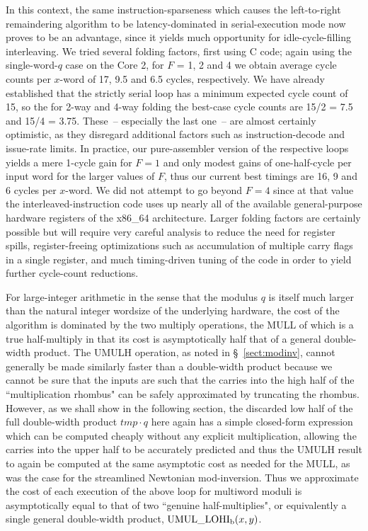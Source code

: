 \documentclass{article}
\begin{document}
In this context, the same instruction-sparseness which causes the left-to-right remaindering algorithm to be latency-dominated in serial-execution mode now proves to be an advantage, since it yields much opportunity for idle-cycle-filling interleaving.  We tried several folding factors, first using C code; again using the single-word-$q$ case on the Core 2, for $F$ = 1, 2 and 4 we obtain average cycle counts per $x$-word of 17, 9.5 and 6.5 cycles, respectively. We have already established that the strictly serial loop has a minimum expected cycle count of 15, so the for 2-way and 4-way folding the best-case cycle counts are 15/2 = 7.5 and 15/4 = 3.75. These~-- especially the last one~-- are almost certainly optimistic, as they disregard additional factors such as instruction-decode and issue-rate limits. In practice, our pure-assembler version of the respective loops yields a mere 1-cycle gain for $F=1$ and only modest gains of one-half-cycle per input word for the larger values of $F$, thus our current best timings are 16, 9 and 6 cycles per $x$-word. We did not attempt to go beyond $F = 4$ since at that value the interleaved-instruction code uses up nearly all of the available general-purpose hardware registers of the x86\_64 architecture. Larger folding factors are certainly possible but will require very careful analysis to reduce the need for register spills, register-freeing optimizations such as accumulation of multiple carry flags in a single register, and much timing-driven tuning of the code in order to yield further cycle-count reductions.

For large-integer arithmetic in the sense that the modulus $q$ is itself much larger than the natural integer wordsize of the underlying hardware, the cost of the algorithm is dominated by the two multiply operations, the MULL of which is a true half-multiply in that its cost is asymptotically half that of a general double-width product. The UMULH operation, as noted in \S~\ref{sect:modinv}, cannot generally be made similarly faster than a double-width product because we cannot be sure that the inputs are such that the carries into the high half of the ``multiplication rhombus" can be safely approximated by truncating the rhombus. However, as we shall show in the following section, the discarded low half of the full double-width product $tmp \cdot q$ here again has a simple closed-form expression which can be computed cheaply without any explicit multiplication, allowing the carries into the upper half to be accurately predicted and thus the UMULH result to again be computed at the same asymptotic cost as needed for the MULL, as was the case for the streamlined Newtonian mod-inversion. Thus we approximate the cost of each execution of the above loop for multiword moduli is asymptotically equal to that of two ``genuine half-multiplies", or equivalently a single general double-width product, ${\rm UMUL\_LOHI_b}(x, y)$.
\end{document}
